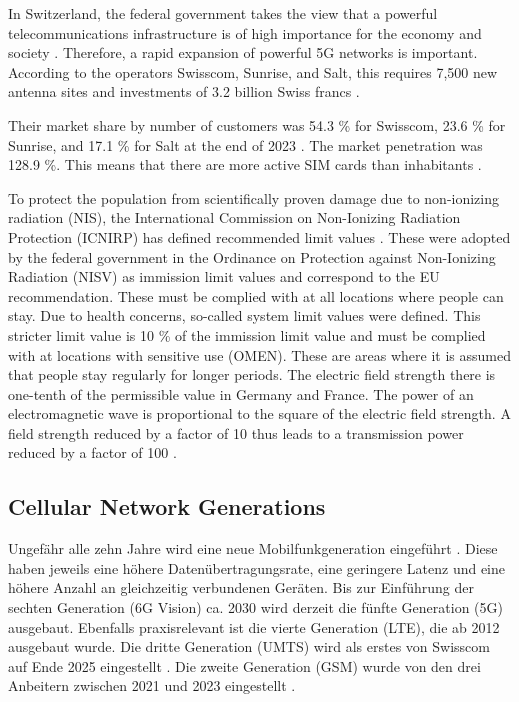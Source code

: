 \begin{English}
    In Switzerland, the federal government takes the view that a powerful telecommunications infrastructure is of high importance for the economy and society \cite{bundesratNachhaltigesMobilfunknetzBericht2022}. Therefore, a rapid expansion of powerful 5G networks is important. According to the operators Swisscom, Sunrise, and Salt, this requires 7,500 new antenna sites and investments of 3.2 billion Swiss francs \cite{bundesratNachhaltigesMobilfunknetzBericht2022}.

    Their market share by number of customers was 54.3 \% for Swisscom, 23.6 \% for Sunrise, and 17.1 \% for Salt at the end of 2023 \cite{bakomMarktanteileMobilfunknetz}. The market penetration was 128.9 \%. This means that there are more active SIM cards than inhabitants \cite{bakomAnzahlMobilfunkkundinnenUnd}.

    To protect the population from scientifically proven damage due to non-ionizing radiation (NIS), the International Commission on Non-Ionizing Radiation Protection (ICNIRP) has defined recommended limit values \cite{baumannMitVerordnungUeber2005}. These were adopted by the federal government in the Ordinance on Protection against Non-Ionizing Radiation (NISV) as immission limit values and correspond to the EU recommendation. These must be complied with at all locations where people can stay. Due to health concerns, so-called system limit values were defined. This stricter limit value is 10 \% of the immission limit value and must be complied with at locations with sensitive use (OMEN). These are areas where it is assumed that people stay regularly for longer periods. The electric field strength there is one-tenth of the permissible value in Germany and France. The power of an electromagnetic wave is proportional to the square of the electric field strength. A field strength reduced by a factor of 10 thus leads to a transmission power reduced by a factor of 100 \cite{chance5gAnlagegrenzwerteImMobilfunk}.
\end{English}

\subsection{Cellular Network Generations}


\begin{German}
    Ungefähr alle zehn Jahre wird eine neue Mobilfunkgeneration eingeführt \cite{bundesratNachhaltigesMobilfunknetzBericht2022}. Diese haben jeweils eine höhere Datenübertragungsrate, eine geringere Latenz und eine höhere Anzahl an gleichzeitig verbundenen Geräten. Bis zur Einführung der sechten Generation (6G Vision) ca. 2030 wird derzeit die fünfte Generation (5G) ausgebaut. Ebenfalls praxisrelevant ist die vierte Generation (LTE), die ab 2012 ausgebaut wurde. Die dritte Generation (UMTS) wird als erstes von Swisscom auf Ende 2025 eingestellt \cite{swisscomAbschaltung3GErneuerung}. Die zweite Generation (GSM) wurde von den drei Anbeitern zwischen 2021 und 2023 eingestellt \cite{onlineSchweizEndgueltigesAus2022}.
\end{German}

